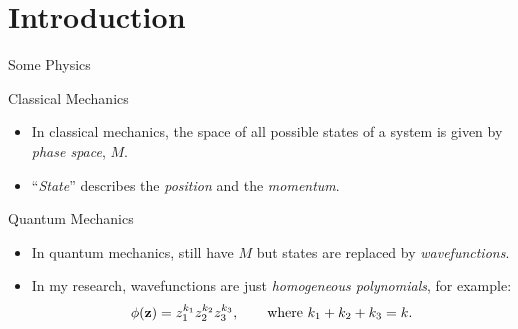 \section{Introduction}

\begin{frame}{Some Physics}

    \begin{block}{Classical Mechanics}
        \begin{itemize}
            \item In classical mechanics, the space of all possible states of a system is given by \emph{phase space}, $M$.
            \item ``\emph{State}'' describes the \emph{position} and the \emph{momentum}.
        \end{itemize}
    \end{block}

    \begin{block}{Quantum Mechanics}
        \begin{itemize}
            \item In quantum mechanics, still have $M$ but states are replaced by \emph{wavefunctions}.
            \item In my research, wavefunctions are just \emph{homogeneous polynomials}, for example:
            $$ \phi(\vb{z}) = z_{1}^{k_{1}}z_{2}^{k_{2}}z_{3}^{k_{3}}, \qquad \text{where } k_{1} + k_{2} + k_{3} = k. $$
        \end{itemize}
    \end{block}

\end{frame}